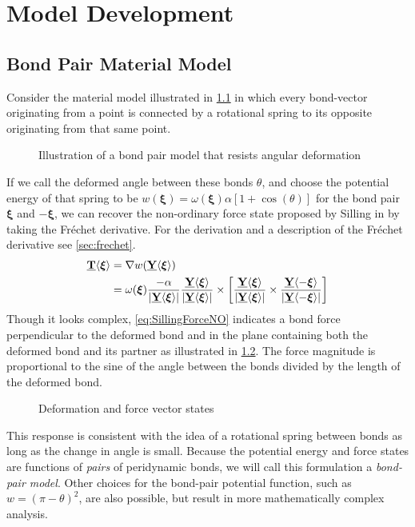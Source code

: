 \chapter{Model Development}
\label{ch:ModelDev}

\section{Bond Pair Material Model}
Consider the material model illustrated in \cref{fig:SimpleBondpair} in which every bond-vector originating from a point is connected by a rotational spring to its opposite originating from that same point.
%
\begin{figure}[h]
\centering
{}
\caption{Illustration of a bond pair model that resists angular deformation}
\label{fig:SimpleBondpair}
\end{figure}
%
If we call the deformed angle between these bonds \(\theta\), and choose the potential energy of that spring to be \(w(\boldsymbol{\xi}) = \omega(\boldsymbol{\xi})\alpha [1 + \cos(\theta) ] \) for the bond pair $\boldsymbol{\xi}$ and $-\boldsymbol{\xi}$, we can recover the non-ordinary force state proposed by Silling in \cite{silling2007peridynamic} by taking the Fr\'echet derivative. For the derivation and a description of the Fr\'echet derivative see \cref{sec:frechet}.
%
\begin{align}
\label{eq:SillingForceNO}
\vstate{T}{}{\boldsymbol{\xi}} &= \nabla w\!\left(\vstate{Y}{}{\boldsymbol{\xi}}\right)\notag \\
%
&=\omega(\boldsymbol{\xi})\frac{-\alpha}{|\vstate{Y}{}{\boldsymbol{\xi}}|} \frac{\vstate{Y}{}{\boldsymbol{\xi}}}{|\vstate{Y}{}{\boldsymbol{\xi}}|} \times \left[\frac{\vstate{Y}{}{\boldsymbol{\xi}}}{|\vstate{Y}{}{\boldsymbol{\xi}}|} \times \frac{\vstate{Y}{}{-\boldsymbol{\xi}}}{|\vstate{Y}{}{-\boldsymbol{\xi}}|}\right]
\end{align}
%
Though it looks complex, \cref{eq:SillingForceNO} indicates a bond force perpendicular to the deformed bond and in the plane containing both the deformed bond and its partner as illustrated in \cref{fig:Bondpair}. 
The force magnitude is proportional to the sine of the angle between the bonds divided by the length of the deformed bond. 
%
\begin{figure}[h]
\centering
{}
\caption{Deformation and force vector states}
\label{fig:Bondpair}
\end{figure}
%
This response is consistent with the idea of a rotational spring between bonds as long as the change in angle is small. 
Because the potential energy and force states are functions of \textit{pairs} of peridynamic bonds, we will call this formulation a \textit{bond-pair model}. 
Other choices for the bond-pair potential function, such as $w = (\pi - \theta)^2$, are also possible, but result in more mathematically complex analysis.

